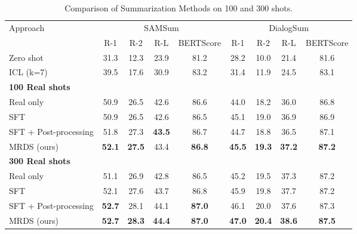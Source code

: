 \begin{table*}[ht]
\centering
\caption{Comparison of Summarization Methods on 100 and 300 shots.}
\label{tab:summarization}
\begin{tabular}{lcccc|cccc}
\toprule
\multirow{2}{*}{Approach} & \multicolumn{4}{c}{SAMSum} & \multicolumn{4}{c}{DialogSum} \\
\cmidrule(lr){2-5} \cmidrule(lr){6-9}
& R-1 & R-2 & R-L & BERTScore & R-1 & R-2 & R-L & BERTScore \\
\midrule
Zero shot & 31.3 & 12.3 & 23.9 & 81.2 & 28.2 & 10.0 & 21.4 & 81.6\\
ICL (k=7) & 39.5 & 17.6 & 30.9 & 83.2 & 31.4 & 11.9 & 24.5 & 83.1\\
\midrule
\textbf{100 Real shots} \\
\midrule
Real only & 50.9 & 26.5 & 42.6 & 86.6 & 44.0 & 18.2 & 36.0 & 86.8 \\ 
SFT & 50.9 & 26.5 & 42.6 & 86.5 & 45.1 & 19.0 & 36.9 & 86.9 \\ 
SFT + Post-processing & 51.8 & 27.3 & \textbf{43.5} & 86.7 & 44.7 & 18.8 & 36.5 & 87.1 \\
MRDS (ours) & \textbf{52.1} & \textbf{27.5} & 43.4 & \textbf{86.8} & \textbf{45.5} & \textbf{19.3} & \textbf{37.2} & \textbf{87.2} \\
\midrule
\textbf{300 Real shots} \\
\midrule
Real only & 51.1 & 26.9 & 42.8 & 86.5 & 45.2 & 19.5 & 37.3 & 87.2 \\
SFT & 52.1 & 27.6 & 43.7 & 86.8 & 45.9 & 19.8 & 37.7 & 87.2 \\ 
SFT + Post-processing & \textbf{52.7} & 28.1 & 44.1 & \textbf{87.0} & 46.1 & 20.0 & 37.6 & 87.3 \\
MRDS (ours) & \textbf{52.7} & \textbf{28.3} & \textbf{44.4} & \textbf{87.0} & \textbf{47.0} & \textbf{20.4} & \textbf{38.6} & \textbf{87.5} \\

\bottomrule
\end{tabular}
\end{table*}


